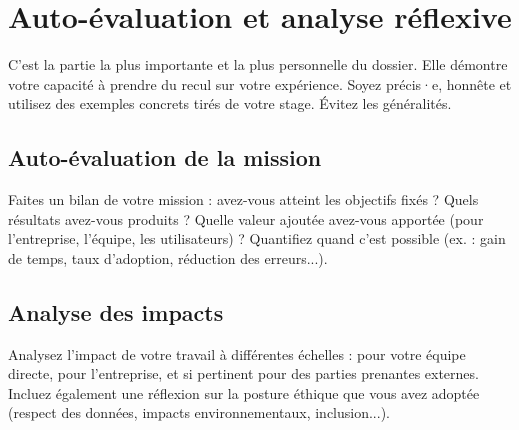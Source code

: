 \section{Auto-évaluation et analyse réflexive}

\begin{guideline}
C'est la partie la plus importante et la plus personnelle du dossier. Elle démontre votre capacité à prendre du recul sur votre expérience. Soyez précis·e, honnête et utilisez des exemples concrets tirés de votre stage. Évitez les généralités.
\end{guideline}


\subsection{Auto-évaluation de la mission}

\begin{guideline}
Faites un bilan de votre mission : avez-vous atteint les objectifs fixés ? Quels résultats avez-vous produits ? Quelle valeur ajoutée avez-vous apportée (pour l'entreprise, l'équipe, les utilisateurs) ? Quantifiez quand c'est possible (ex. : gain de temps, taux d'adoption, réduction des erreurs...).
\end{guideline}



\subsection{Analyse des impacts}

\begin{guideline}
Analysez l'impact de votre travail à différentes échelles : pour votre équipe directe, pour l'entreprise, et si pertinent pour des parties prenantes externes. Incluez également une réflexion sur la posture éthique que vous avez adoptée (respect des données, impacts environnementaux, inclusion...).
\end{guideline}



